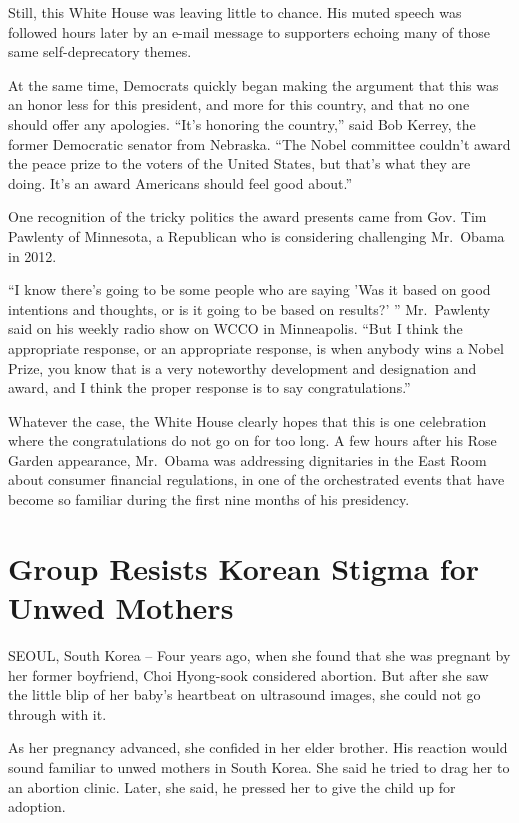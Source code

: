 ﻿\documentclass[12pt]{article}
\begin{document}
Still, this White House was leaving little to chance. His muted speech was followed hours later by
an e-mail message to supporters echoing many of those same self-deprecatory themes.

At the same time, Democrats quickly began making the argument that this was an honor less for this
president, and more for this country, and that no one should offer any apologies. ``It's honoring
the country,'' said Bob Kerrey, the former Democratic senator from Nebraska. ``The Nobel committee
couldn't award the peace prize to the voters of the United States, but that's what they are doing.
It's an award Americans should feel good about.''

One recognition of the tricky politics the award presents came from Gov. Tim Pawlenty of Minnesota,
a Republican who is considering challenging Mr.~Obama in 2012.

``I know there's going to be some people who are saying 'Was it based on good intentions and
thoughts, or is it going to be based on results?' '' Mr.~Pawlenty said on his weekly radio show on
WCCO in Minneapolis. ``But I think the appropriate response, or an appropriate response, is when
anybody wins a Nobel Prize, you know that is a very noteworthy development and designation and
award, and I think the proper response is to say congratulations.''

Whatever the case, the White House clearly hopes that this is one celebration where the
congratulations do not go on for too long. A few hours after his Rose Garden appearance, Mr.~Obama
was addressing dignitaries in the East Room about consumer financial regulations, in one of the
orchestrated events that have become so familiar during the first nine months of his presidency.

\section{Group Resists Korean Stigma\cite{stigma} for Unwed Mothers}

\lettrine{S}{EOUL}, South Korea -- Four years ago, when she found that she
was pregnant by her former boyfriend, Choi Hyong-sook considered abortion. But after she saw the
little blip of her baby's heartbeat on ultrasound images, she could not go through with it.

As her pregnancy advanced, she confided in her elder brother. His reaction would sound familiar to
unwed mothers in South Korea. She said he tried to drag her to an abortion clinic. Later, she said,
he pressed her to give the child up for adoption.
\end{document}

